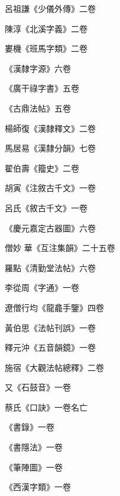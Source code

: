 \begin{pinyinscope}
 呂祖謙《少儀外傳》二卷



 陳淳《北溪字義》二卷



 婁機《班馬字類》二卷



 《漢隸字源》六卷



 《廣干祿字書》五卷



 《古鼎法帖》五卷



 楊師復《漢隸釋文》二卷



 馬居易《漢隸分韻》七卷



 翟伯壽《籀史》二卷



 胡寅《注敘古千文》一卷



 呂氏《敘古千文》一卷



 《慶元嘉定古器圖》六卷



 僧妙
 華《互注集韻》二十五卷



 羅點《清勤堂法帖》六卷



 李從周《字通》一卷



 遼僧行均《龍龕手鑒》四卷



 黃伯思《法帖刊誤》一卷



 釋元沖《五音韻鏡》一卷



 施宿《大觀法帖總釋》二卷



 又《石鼓音》一卷



 蔡氏《口訣》一卷名亡



 《書錄》一卷



 《書隱法》一卷



 《筆陣圖》一卷



 《西漢字類》一卷




\end{pinyinscope}
